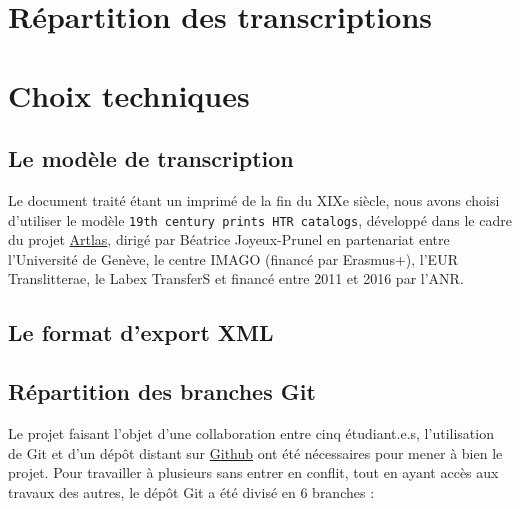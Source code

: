 \documentclass{article}
\begin{document}
	
	
	\section{Répartition des transcriptions}
	
	
	
	\section{Choix techniques}
	
	\subsection{Le modèle de transcription}
	
	Le document traité étant un imprimé de la fin du XIXe siècle, nous avons choisi d'utiliser le modèle \texttt{19th century prints HTR catalogs}, développé dans le cadre du projet \href{https://artlas.huma-num.fr/fr/}{Artlas}, dirigé par Béatrice Joyeux-Prunel en partenariat entre l'Université de Genève, le centre IMAGO (financé par Erasmus+), l'EUR Translitterae, le Labex TransferS et financé entre 2011 et 2016 par l'ANR.
	
	
	\subsection{Le format d'export XML}
	
	
	\subsection{Répartition des branches Git}
	
	Le projet faisant l'objet d'une collaboration entre cinq étudiant.e.s, l'utilisation de Git et d'un dépôt distant sur \href{https://github.com/kat-kel/TNAH-2021-Expositions_Universelles/}{Github} ont été nécessaires pour mener à bien le projet. Pour travailler à plusieurs sans entrer en conflit, tout en ayant accès aux travaux des autres, le dépôt Git a été divisé en 6 branches :
	
\end{document}
